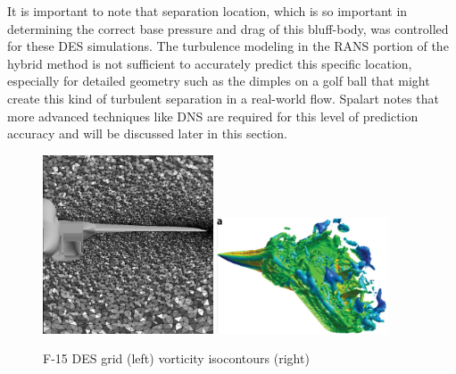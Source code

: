 \documentclass[journal]{new-aiaa}
\begin{document}
It is important to note that separation location, which is so important in determining the correct base pressure and drag of this bluff-body, was controlled for these DES simulations. The turbulence modeling in the RANS portion of the hybrid method is not sufficient to accurately predict this specific location, especially for detailed geometry such as the dimples on a golf ball that might create this kind of turbulent separation in a real-world flow. Spalart notes that more advanced techniques like DNS are required for this level of prediction accuracy and will be discussed later in this section.








\begin{figure}[H]
\begin{center}
\includegraphics[width=0.45\textwidth]{Images/logan/forsythe2004detachededdy_f15grid.pdf}
\includegraphics[width=0.45\textwidth]{Images/logan/spalart2009detachededdy_f15des.pdf}
\caption{ F-15 DES grid (left) \cite{forsythe2004detachededdy} vorticity isocontours (right) \cite{spalart2009detachededdy} }
\label{fig:f15des}
\end{center}
\end{figure}
\end{document}

